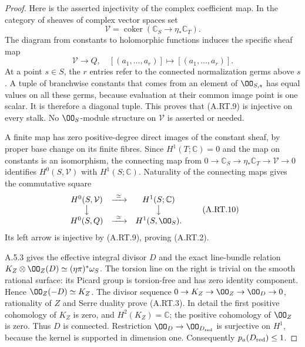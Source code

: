 \begin{proof}
Here is the asserted injectivity of the complex coefficient map.
In the category of sheaves of complex vector spaces set
\[
 \mathcal V=\operatorname{coker}
     (\mathbb C_S\longrightarrow\eta_*\mathbb C_T).
\]
The diagram from constants to holomorphic functions induces the
specific sheaf map
\[
 \mathcal V\longrightarrow Q,
 \quad[(a_1,\ldots,a_r)]\longmapsto[(a_1,\ldots,a_r)] .
\tag{A.RT.9}
\]
At a point $s\in S$, the $r$ entries refer to the connected
normalization germs above $s$. A tuple of branchwise constants
that comes from an element of $\OO_{S,s}$ has equal values on
all these germs, because evaluation at their common image point
is one scalar. It is therefore a diagonal tuple. This proves
that (A.RT.9) is injective on every stalk. No $\OO_S$-module
structure on $\mathcal V$ is asserted or needed.

A finite map has zero positive-degree direct images of the
constant sheaf, by proper base change on its finite fibres.
Since $H^1(T;\mathbb C)=0$ and the map on constants is an
isomorphism, the connecting map from
$0\to\mathbb C_S\to\eta_*\mathbb C_T\to\mathcal V\to0$
identifies $H^0(S,\mathcal V)$ with $H^1(S;\mathbb C)$.
Naturality of the connecting maps gives the commutative square
\[
\begin{array}{ccc}
 H^0(S,\mathcal V)&\xrightarrow{\ \simeq\ }&H^1(S;\mathbb C)\\
 \big\downarrow&&\big\downarrow\\
 H^0(S,Q)&\xrightarrow{\ \simeq\ }&H^1(S,\OO_S).
\end{array}
\tag{A.RT.10}
\]
Its left arrow is injective by (A.RT.9), proving (A.RT.2).

A.5.3 gives the effective integral divisor $D$ and the exact
line-bundle relation
$K_Z\otimes\OO_Z(D)\simeq(\eta\pi)^*\omega_S$.
The torsion line on the right is trivial on the smooth rational
surface: its Picard group is torsion-free and has zero identity
component. Hence $\OO_Z(-D)\simeq K_Z$. The divisor sequence
$0\to K_Z\to\OO_Z\to\OO_D\to0$, rationality of $Z$ and
Serre duality prove (A.RT.3). In detail the first positive
cohomology of $K_Z$ is zero, and $H^2(K_Z)=\mathbb C$;
the positive cohomology of $\OO_Z$ is zero. Thus $D$ is
connected. Restriction $\OO_D\to\OO_{D_{\rm red}}$ is
surjective on $H^1$, because the kernel is supported in
dimension one. Consequently $p_a(D_{\rm red})\le1$.


\end{proof}

